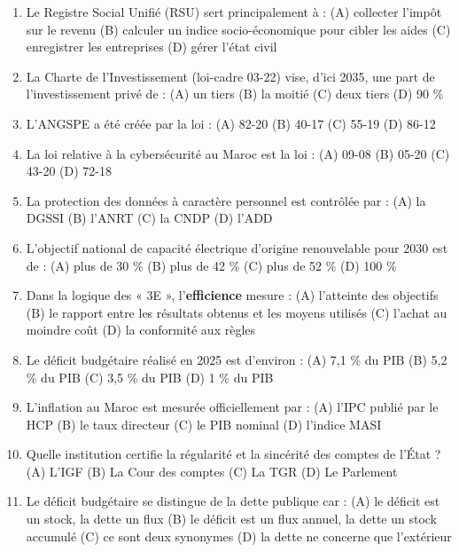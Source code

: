 \begin{enumerate}[leftmargin=*, label=\textbf{Q\arabic*.}]
    \newline (A) 69-19 \quad (B) 03-22 \quad (C) 09-21 \quad (D) 50-21
    \item Le Registre Social Unifié (RSU) sert principalement à :
    \newline (A) collecter l'impôt sur le revenu \quad (B) calculer un indice socio-économique pour cibler les aides
    \newline (C) enregistrer les entreprises \quad (D) gérer l'état civil
    \item La Charte de l'Investissement (loi-cadre 03-22) vise, d'ici 2035, une part de l'investissement privé de :
    \newline (A) un tiers \quad (B) la moitié \quad (C) deux tiers \quad (D) 90 \%
    \item L'ANGSPE a été créée par la loi :
    \newline (A) 82-20 \quad (B) 40-17 \quad (C) 55-19 \quad (D) 86-12
    \item La loi relative à la cybersécurité au Maroc est la loi :
    \newline (A) 09-08 \quad (B) 05-20 \quad (C) 43-20 \quad (D) 72-18
    \item La protection des données à caractère personnel est contrôlée par :
    \newline (A) la DGSSI \quad (B) l'ANRT \quad (C) la CNDP \quad (D) l'ADD
    \item L'objectif national de capacité électrique d'origine renouvelable pour 2030 est de :
    \newline (A) plus de 30 \% \quad (B) plus de 42 \% \quad (C) plus de 52 \% \quad (D) 100 \%
    \item Dans la logique des « 3E », l'\textbf{efficience} mesure :
    \newline (A) l'atteinte des objectifs \quad (B) le rapport entre les résultats obtenus et les moyens utilisés
    \newline (C) l'achat au moindre coût \quad (D) la conformité aux règles
    \item Le déficit budgétaire réalisé en 2025 est d'environ :
    \newline (A) 7,1 \% du PIB \quad (B) 5,2 \% du PIB \quad (C) 3,5 \% du PIB \quad (D) 1 \% du PIB
    \item L'inflation au Maroc est mesurée officiellement par :
    \newline (A) l'IPC publié par le HCP \quad (B) le taux directeur \quad (C) le PIB nominal \quad (D) l'indice MASI
    \item Quelle institution certifie la régularité et la sincérité des comptes de l'État ?
    \newline (A) L'IGF \quad (B) La Cour des comptes \quad (C) La TGR \quad (D) Le Parlement
    \item Le déficit budgétaire se distingue de la dette publique car :
    \newline (A) le déficit est un stock, la dette un flux \quad (B) le déficit est un flux annuel, la dette un stock accumulé
    \newline (C) ce sont deux synonymes \quad (D) la dette ne concerne que l'extérieur
\end{enumerate}

